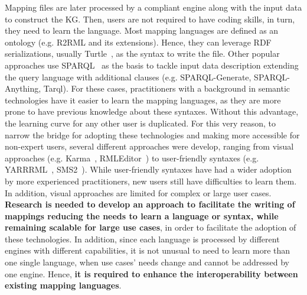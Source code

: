 
Mapping files are later processed by a compliant engine along with the input data to construct the KG. Then, users are not required to have coding skills, in turn, they need to learn the language. Most mapping languages are defined as an ontology (e.g. R2RML and its extensions). Hence, they can leverage RDF serializations, usually Turtle~\citep{turtle}, as the syntax to write the file. Other popular approaches use SPARQL~\citep{harris2013sparql} as the basis to tackle input data description extending the query language with additional clauses (e.g. SPARQL-Generate, SPARQL-Anything, Tarql). For these cases, practitioners with a background in semantic technologies have it easier to learn the mapping languages, as they are more prone to have previous knowledge about these syntaxes. Without this advantage, the learning curve for any other user is duplicated. For this very reason, to narrow the bridge for adopting these technologies and making more accessible for non-expert users, several different approaches were develop, ranging from visual approaches (e.g. Karma~\citep{gupta2012karma}, RMLEditor~\citep{heyvaert2016rmleditor}) to user-friendly syntaxes (e.g. YARRRML~\citep{Heyvaert2018yarrrml}, SMS2~\citep{sms2}). While user-friendly syntaxes have had a wider adoption by more experienced practitioners, new users still have difficulties to learn them. In addition, visual approaches are limited for complex or large user cases. \textbf{Research is needed to develop an approach to facilitate the writing of mappings reducing the needs to learn a language or syntax, while remaining scalable for large use cases}, in order to facilitate the adoption of these technologies. In addition, since each language is processed by different engines with different capabilities, it is not unusual to need to learn more than one single language, when use cases' needs change and cannot be addressed by one engine. Hence, \textbf{it is required to enhance the interoperability between existing mapping languages}. 

